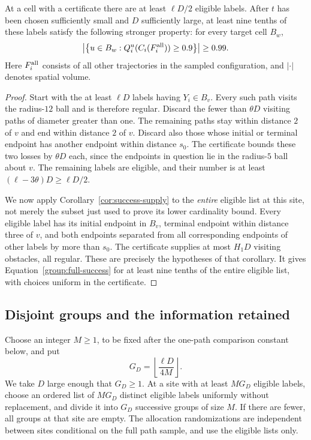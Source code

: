 \begin{lemma}\label{lem:useful-labels}
At a cell with a certificate there are at least $\ell D/2$ eligible
labels.  After $t$ has been chosen sufficiently small and $D$ sufficiently
large, at least nine tenths of these labels satisfy the following
stronger property: for every target cell $B_w$,
\begin{equation}\label{group:full-success}
 \left|\left\{u\in B_w:
 Q_i^u(C_i(F_i^{\rm all}))\ge0.9\right\}\right|\ge0.99.
\end{equation}
Here $F_i^{\rm all}$ consists of all other trajectories in the sampled
configuration, and $|\cdot|$ denotes spatial volume.
\end{lemma}

\begin{proof}
Start with the at least $\ell D$ labels having $Y_i\in B_v$.
Every such path visits the radius-$12$ ball and is therefore regular.
Discard the fewer than $\theta D$ visiting paths of diameter greater
than one.  The remaining paths stay within distance $2$ of $v$ and
end within distance $2$ of $v$.  Discard also those whose initial or
terminal endpoint has another endpoint within distance $s_0$.
The certificate bounds these two losses by $\theta D$ each, since
the endpoints in question lie in the radius-$5$ ball about $v$.
The remaining labels are eligible, and their number is at least
$(\ell-3\theta)D\ge\ell D/2$.

We now apply Corollary~\ref{cor:success-supply} to the
\emph{entire} eligible list at this site, not merely the subset just
used to prove its lower cardinality bound.  Every eligible label has
its initial endpoint in $B_v$, terminal endpoint within distance
three of $v$, and both endpoints separated from all corresponding
endpoints of other labels by more than $s_0$.  The certificate supplies
at most $H_1D$ visiting obstacles, all regular.  These are precisely
the hypotheses of that corollary.  It gives
Equation~\eqref{group:full-success} for at least nine tenths of the
entire eligible list, with choices uniform in the certificate.
\end{proof}

\subsection{Disjoint groups and the information retained}

Choose an integer $M\ge1$, to be fixed after the one-path comparison
constant below, and put
\begin{equation}\label{group:number}
G_D=\left\lfloor\frac{\ell D}{4M}\right\rfloor.
\end{equation}
We take $D$ large enough that $G_D\ge1$.
At a site with at least $MG_D$ eligible labels, choose an ordered list
of $MG_D$ distinct eligible labels uniformly without replacement,
and divide it into $G_D$ successive groups of size $M$.
If there are fewer, all groups at that site are empty.  The allocation
randomizations are independent between sites conditional on the full
path sample, and use the eligible lists only.

